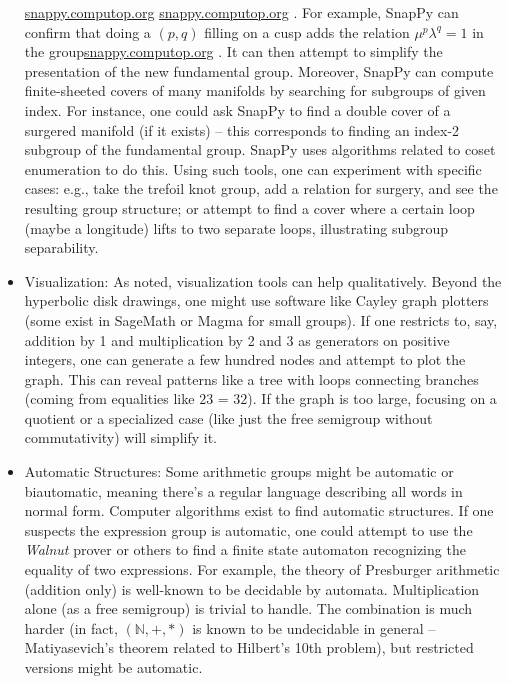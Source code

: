 \documentclass[11pt]{article}
\theoremstyle{remark}
\begin{document}
\begin{itemize}
\href{https://snappy.computop.org/manifold.html#:~:text=A%20Manifold%20is%20a%20Triangulation,manifolds.%20Here%E2%80%99s%20a%20quick%20example}{snappy.computop.org}
\href{https://snappy.computop.org/manifold.html#:~:text=A%20Manifold%20can%20be%20specified,g}{snappy.computop.org}
. For example, SnapPy can confirm that doing a $(p,q)$ filling on a cusp adds the relation $\mu^p\lambda^q=1$ in the group\href{https://snappy.computop.org/manifold.html#:~:text=Return%20a%20HolonomyGroup%20representing%20the,corresponding%20peripheral%20elements%20are%20killed}{snappy.computop.org}
. It can then attempt to simplify the presentation of the new fundamental group. Moreover, SnapPy can compute finite-sheeted covers of many manifolds by searching for subgroups of given index. For instance, one could ask SnapPy to find a double cover of a surgered manifold (if it exists) – this corresponds to finding an index-2 subgroup of the fundamental group. SnapPy uses algorithms related to coset enumeration to do this. Using such tools, one can experiment with specific cases: e.g., take the trefoil knot group, add a relation for surgery, and see the resulting group structure; or attempt to find a cover where a certain loop (maybe a longitude) lifts to two separate loops, illustrating subgroup separability.


\item Visualization: As noted, visualization tools can help qualitatively. Beyond the hyperbolic disk drawings, one might use software like Cayley graph plotters (some exist in SageMath or Magma for small groups). If one restricts to, say, addition by 1 and multiplication by 2 and 3 as generators on positive integers, one can generate a few hundred nodes and attempt to plot the graph. This can reveal patterns like a tree with loops connecting branches (coming from equalities like $2\textit{3 = 3}2$). If the graph is too large, focusing on a quotient or a specialized case (like just the free semigroup without commutativity) will simplify it.


\item Automatic Structures: Some arithmetic groups might be automatic or biautomatic, meaning there’s a regular language describing all words in normal form. Computer algorithms exist to find automatic structures. If one suspects the expression group is automatic, one could attempt to use the \textit{Walnut} prover or others to find a finite state automaton recognizing the equality of two expressions. For example, the theory of Presburger arithmetic (addition only) is well-known to be decidable by automata. Multiplication alone (as a free semigroup) is trivial to handle. The combination is much harder (in fact, $(\mathbb{N},+,*)$ is known to be undecidable in general – Matiyasevich’s theorem related to Hilbert’s 10th problem), but restricted versions might be automatic.


\end{itemize}
\end{document}
